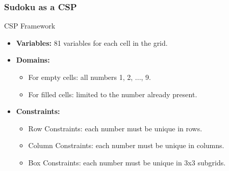 \documentclass[aspectratio=169]{beamer}
\begin{document}
\begin{frame}[fragile]
    \frametitle{Sudoku as a CSP}
    \begin{block}{CSP Framework}
        \begin{itemize}
            \item \textbf{Variables:} 81 variables for each cell in the grid.
            \item \textbf{Domains:} 
                \begin{itemize}
                    \item For empty cells: all numbers {1, 2, ..., 9}.
                    \item For filled cells: limited to the number already present.
                \end{itemize}
            \item \textbf{Constraints:} 
                \begin{itemize}
                    \item Row Constraints: each number must be unique in rows.
                    \item Column Constraints: each number must be unique in columns.
                    \item Box Constraints: each number must be unique in 3x3 subgrids.
                \end{itemize}
        \end{itemize}
    \end{block}
\end{frame}
\end{document}
